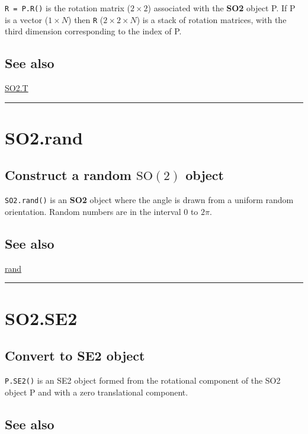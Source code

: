 \texttt{R = P.R()} is the rotation matrix ($2 \times 2$) associated with the \textbf{\color{red} SO2} object P.
If P is a vector ($1 \times N$) then \texttt{R} ($2 \times 2 \times N$) is a stack of rotation matrices, with
the third dimension corresponding to the index of P.


\subsection*{See also}


\hyperlink{SO2.T}{\color{blue} SO2.T}

\vspace{1.5ex}\hrule

\hypertarget{SO2.rand}{\section*{SO2.rand}}
\subsection*{Construct a random $\mbox{SO}(2)$ object}


\texttt{SO2.rand()} is an \textbf{\color{red} SO2} object where the angle is drawn from a uniform
random orientation. Random numbers are in the interval 0 to $2\pi$.


\subsection*{See also}


\hyperlink{rand}{\color{blue} rand}

\vspace{1.5ex}\hrule

\hypertarget{SO2.SE2}{\section*{SO2.SE2}}
\subsection*{Convert to SE2 object}


\texttt{P.SE2()} is an SE2 object formed from the rotational component of the
SO2 object P and with a zero translational component.


\subsection*{See also}



